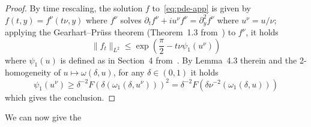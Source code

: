 \documentclass[11pt,oneside,reqno]{amsart}
\numberwithin{equation}{section}
\begin{document}
\begin{proof}
  By time rescaling, the solution $f$ to~\eqref{eq:pde-app} is given by $f (t,
  y) = f^{\nu} (t \nu, y)$ where $f^{\nu}$ solves $\partial_t f^{\nu} + i
  u^{\nu} f^{\nu} = \partial_y^2 f^{\nu}$ where $u^{\nu} = u / \nu$; applying
  the Gearhart--Pr\"{u}ss theorem (Theorem~1.3 from~{\cite{wei}}) to
  $f^{\nu}$, it holds
  \[ \| f_t \|_{L^2} \leqslant \exp \left( \frac{\pi}{2} - t \nu \psi_1
     (u^{\nu}) \right) \]
  where $\psi_1 (u)$ is defined as in Section~4 from~{\cite{wei}}. By
  Lemma~4.3 therein and the 2-homogeneity of $u \mapsto \omega (\delta, u)$,
  for any $\delta \in (0, 1)$ it holds
  \[ \psi_1 (u^{\nu}) \geqslant \delta^{- 2} F (\delta (\omega_1 (\delta,
     u^{\nu})))^2 = \delta^{- 2} F (\delta \nu^{- 2} (\omega_1 (\delta, u)))
  \]
  which gives the conclusion.
\end{proof}

We can now give the
\end{document}
